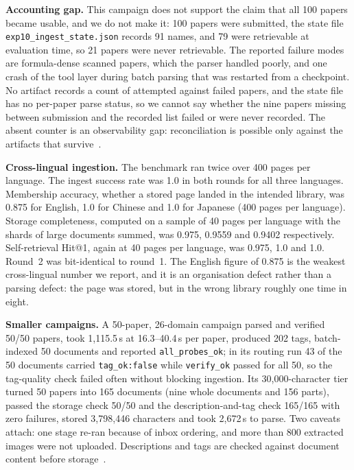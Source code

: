 \textbf{Accounting gap.} This campaign does not support the claim that all 100 papers became usable, and we do not make it: 100 papers were submitted, the state file \texttt{exp10\allowbreak\_ingest\allowbreak\_state.json} records 91 names, and 79 were retrievable at evaluation time, so 21 papers were never retrievable. The reported failure modes are formula-dense scanned papers, which the parser handled poorly, and one crash of the tool layer during batch parsing that was restarted from a checkpoint. No artifact records a count of attempted against failed papers, and the state file has no per-paper parse status, so we cannot say whether the nine papers missing between submission and the recorded list failed or were never recorded. The absent counter is an observability gap: reconciliation is possible only against the artifacts that survive~\cite{missier-prov-2013}.

\textbf{Cross-lingual ingestion.} The benchmark ran twice over 400 pages per language. The ingest success rate was 1.0 in both rounds for all three languages. Membership accuracy, whether a stored page landed in the intended library, was 0.875 for English, 1.0 for Chinese and 1.0 for Japanese (400 pages per language). Storage completeness, computed on a sample of 40 pages per language with the shards of large documents summed, was 0.975, 0.9559 and 0.9402 respectively. Self-retrieval Hit@1, again at 40 pages per language, was 0.975, 1.0 and 1.0. Round~2 was bit-identical to round~1. The English figure of 0.875 is the weakest cross-lingual number we report, and it is an organisation defect rather than a parsing defect: the page was stored, but in the wrong library roughly one time in eight.

\textbf{Smaller campaigns.} A 50-paper, 26-domain campaign parsed and verified 50/50 papers, took 1{,}115.5\,s at 16.3--40.4\,s per paper, produced 202 tags, batch-indexed 50 documents and reported \texttt{all\_probes\_ok}; in its routing run 43 of the 50 documents carried \texttt{tag\_ok:false} while \texttt{verify\_ok} passed for all 50, so the tag-quality check failed often without blocking ingestion. Its 30{,}000-character tier turned 50 papers into 165 documents (nine whole documents and 156 parts), passed the storage check 50/50 and the description-and-tag check 165/165 with zero failures, stored 3{,}798{,}446 characters and took 2{,}672\,s to parse. Two caveats attach: one stage re-ran because of inbox ordering, and more than 800 extracted images were not uploaded. Descriptions and tags are checked against document content before storage~\cite{park-metadata-quality-2009}.

